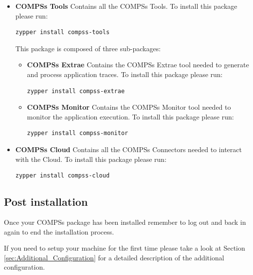 \begin{itemize}
 \item \textbf{COMPSs Tools} \newline
       Contains all the COMPSs Tools.
       \newline
       To install this package please run:
       \begin{lstlisting}[language=bash]
	  zypper install compss-tools
       \end{lstlisting}
       This package is composed of three sub-packages:
       \begin{itemize}
        \item \textbf{COMPSs Extrae} \newline
	      Contains the COMPSs Extrae tool needed to generate and process application traces.
	      \newline
	      To install this package please run:
	      \begin{lstlisting}[language=bash]
		  zypper install compss-extrae
	      \end{lstlisting}
        \item \textbf{COMPSs Monitor} \newline
              Contains the COMPSs Monitor tool needed to monitor the application execution. 
              \newline
	      To install this package please run:
	      \begin{lstlisting}[language=bash]
		  zypper install compss-monitor
	      \end{lstlisting}
       \end{itemize}

 \item \textbf{COMPSs Cloud} \newline
       Contains all the COMPSs Connectors needed to interact with the Cloud.
       \newline
       To install this package please run:
       \begin{lstlisting}[language=bash]
	  zypper install compss-cloud
       \end{lstlisting}
\end{itemize} 

\subsection{Post installation}
Once your COMPSs package has been installed remember to log out and back in again to end the installation process.

If you need to setup your machine for the first time please take a look at Section \ref{sec:Additional_Configuration} for a 
detailed description of the additional configuration. 